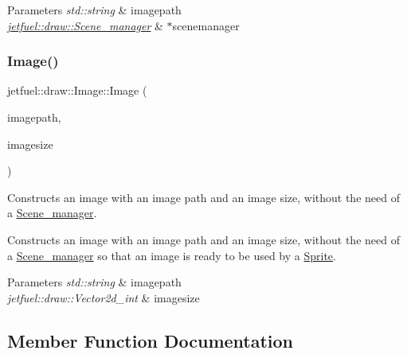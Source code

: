 \begin{DoxyParams}{Parameters}
{\em std\+::string} & imagepath \\
\hline
{\em \hyperlink{classjetfuel_1_1draw_1_1Scene__manager}{jetfuel\+::draw\+::\+Scene\+\_\+manager}} & $\ast$scenemanager \\
\hline
\end{DoxyParams}
\mbox{\label{classjetfuel_1_1draw_1_1Image_a80771f30728e311a58d7e0fa5844a6d5}} 
\subsubsection{\texorpdfstring{Image()}{Image()}\hspace{0.1cm}{\footnotesize\ttfamily [3/3]}}
{\footnotesize\ttfamily jetfuel\+::draw\+::\+Image\+::\+Image (\begin{DoxyParamCaption}\item[{const std\+::string}]{imagepath,  }\item[{const \hyperlink{classjetfuel_1_1draw_1_1Vector2d}{Vector2d\+\_\+int}}]{imagesize }\end{DoxyParamCaption})}



Constructs an image with an image path and an image size, without the need of a \hyperlink{classjetfuel_1_1draw_1_1Scene__manager}{Scene\+\_\+manager}. 

Constructs an image with an image path and an image size, without the need of a \hyperlink{classjetfuel_1_1draw_1_1Scene__manager}{Scene\+\_\+manager} so that an image is ready to be used by a \hyperlink{classjetfuel_1_1draw_1_1Sprite}{Sprite}.


\begin{DoxyParams}{Parameters}
{\em std\+::string} & imagepath \\
\hline
{\em jetfuel\+::draw\+::\+Vector2d\+\_\+int} & imagesize \\
\hline
\end{DoxyParams}


\subsection{Member Function Documentation}
\mbox{\label{classjetfuel_1_1draw_1_1Image_a4014f980cf67b0716b57b48f7a98020e}} 
